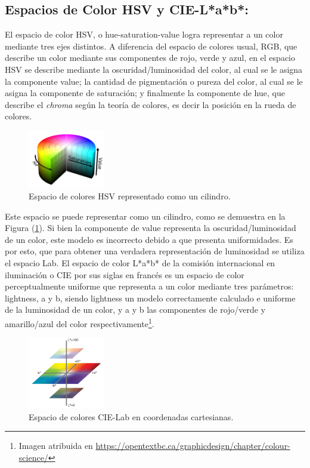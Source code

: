 \subsection{Espacios de Color HSV y CIE-L*a*b*:}
El espacio de color HSV, o hue-saturation-value logra representar a un color mediante tres ejes distintos. A diferencia del espacio de colores usual, RGB, que describe un color mediante sus componentes de rojo, verde y azul, en el espacio HSV se describe mediante la oscuridad/luminosidad del color, al cual se le asigna la componente value; la cantidad de pigmentación o pureza del color, al cual se le asigna la componente de saturación; y finalmente la componente de hue, que describe el \textit{chroma} según la teoría de colores, es decir la posición en la rueda de colores.

\begin{figure}[H]
		\centering
		\includegraphics[width=0.3\textwidth]{Imagenes/hsv.png}
		\caption{Espacio de colores HSV representado como un cilindro.}
		\label{fig:hsv}
\end{figure}

Este espacio se puede representar como un cilindro, como se demuestra en la Figura (\ref{fig:hsv}). Si bien la componente de value representa la oscuridad/luminosidad de un color, este modelo es incorrecto debido a que presenta uniformidades. Es por esto, que para obtener una verdadera representación de luminosidad se utiliza el espacio Lab.
El espacio de color L*a*b* de la comisión internacional en iluminación o CIE por sus siglas en francés es un espacio de color perceptualmente uniforme que representa a un color mediante tres parámetros: lightness, a y b, siendo lightness un modelo correctamente calculado e uniforme de la luminosidad de un color, y a y b las componentes de rojo/verde y amarillo/azul del color respectivamente\footnote{Imagen atribuida en \href{https://opentextbc.ca/graphicdesign/chapter/colour-science/}{https:\slash \slash opentextbc.ca\slash graphicdesign\slash chapter\slash colour-science\slash}}.
\begin{figure}[H]
		\centering
		\includegraphics[width=0.3\textwidth]{Imagenes/lab.png}
		\caption{Espacio de colores CIE-Lab en coordenadas cartesianas.}
		\label{fig:lab}
\end{figure}

